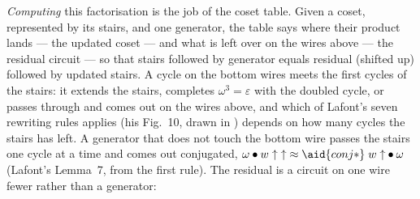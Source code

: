 \emph{Computing} this factorisation is the job of the coset table. Given a coset, represented by its stairs, and one generator, the table says where their product lands --- the updated coset --- and what is left over on the wires above --- the residual circuit --- so that stairs followed by generator equals residual (shifted up) followed by updated stairs. A cycle on the bottom wires meets the first cycles of the stairs: it extends the stairs, completes $\omega^3 = \varepsilon$ with the doubled cycle, or passes through and comes out on the wires above, and which of Lafont's seven rewriting rules applies (his Fig.~10, drawn in ) depends on how many cycles the stairs has left. A generator that does not touch the bottom wire passes the stairs one cycle at a time and comes out conjugated, $\omega \bullet w\;{\uparrow}\;{\uparrow} \approx \aid{conj*}\;w\;{\uparrow} \bullet \omega$ (Lafont's Lemma~7, from the first rule). The residual is a circuit on one wire fewer rather than a generator:

